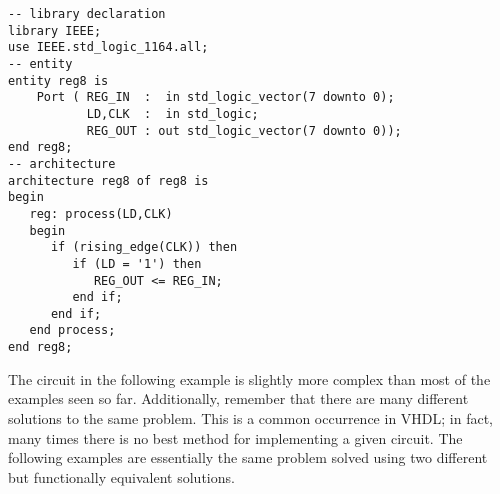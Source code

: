 \noindent
\begin{minipage}{0.99\linewidth}
\begin{lstlisting}[label=ex23_code, caption=Solution to Example 23.]
-- library declaration
library IEEE;
use IEEE.std_logic_1164.all;
-- entity
entity reg8 is
    Port ( REG_IN  :  in std_logic_vector(7 downto 0);
           LD,CLK  :  in std_logic;
           REG_OUT : out std_logic_vector(7 downto 0));
end reg8;
-- architecture
architecture reg8 of reg8 is
begin
   reg: process(LD,CLK)
   begin
      if (rising_edge(CLK)) then 
         if (LD = '1') then 
            REG_OUT <= REG_IN; 
         end if;
      end if;
   end process; 
end reg8;
\end{lstlisting}
\end{minipage}

The circuit in the following example is slightly more complex than most of the examples seen so far. Additionally, remember that there are many different solutions to the same problem. This is a common occurrence in VHDL; in fact, many times there is no best method for implementing a given circuit. The following examples are essentially the same problem solved using two different but functionally equivalent solutions.

